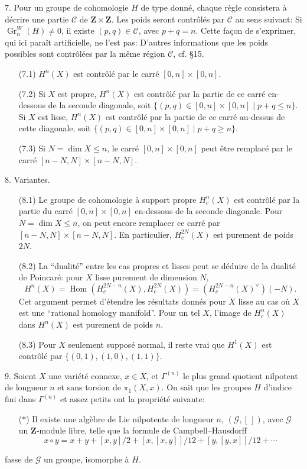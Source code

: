 \documentclass{amsart}
\theoremstyle{plain}
\theoremstyle{definition}
\theoremstyle{remark}
\DeclareMathOperator{\Gr}{Gr}
\DeclareMathOperator{\Hom}{Hom}
\begin{document}
7. Pour un groupe de cohomologie $H$ de type donn\'e, chaque r\`egle consistera \`a d\'ecrire une partie $\mathscr{C}$ de $\mathbf{Z} \times \mathbf{Z}$. Les poids seront contr\^ol\'es par $\mathscr{C}$ au sens suivant: Si $\Gr_n^W(H) \neq 0$, il existe $(p,q) \in \mathscr{C}$, avec $p + q = n$. Cette fa\c{c}on de s'exprimer, qui ici para\^it artificielle, ne l'est pas: D'autres informations que les poids possibles sont contr\^ol\'ees par la m\^eme r\'egion $\mathscr{C}$, cf. \S 15.
\begin{itemize}
\item[(7.1)] $H^n(X)$ est contr\^ol\'e par le carr\'e $[0,n] \times [0,n]$.
\item[(7.2)] Si $X$ est propre, $H^n(X)$ est contr\^ol\'e par la partie de ce carr\'e en-dessous de la seconde diagonale, soit $\{(p,q) \in [0,n] \times [0,n] \mid p + q \leq n\}$. Si $X$ est lisse, $H^n(X)$ est contr\^ol\'e par la partie de ce carr\'e au-dessus de cette diagonale, soit $\{(p,q) \in [0,n] \times [0,n] \mid p + q \geq n\}$.
\item[(7.3)] Si $N = \dim X \leq n$, le carr\'e $[0,n] \times [0,n]$ peut \^etre remplac\'e par le carr\'e $[n-N,N] \times [n-N,N]$.
\end{itemize}

8. Variantes.
\begin{itemize}
\item[(8.1)] Le groupe de cohomologie \`a support propre $H_c^n(X)$ est contr\^ol\'e par la partie du carr\'e $[0,n] \times [0,n]$ en-dessous de la seconde diagonale. Pour $N = \dim X \leq n$, on peut encore remplacer ce carr\'e par $[n-N,N] \times [n-N,N]$. En particulier, $H_c^{2N}(X)$ est purement de poids $2N$.
\item[(8.2)] La ``dualit\'e'' entre les cas propres et lisses peut se d\'eduire de la dualit\'e de Poincar\'e: pour $X$ lisse purement de dimension $N$,
\[
H^n(X) = \Hom(H_c^{2N-n}(X), H_c^{2N}(X)) = (H_c^{2N-n}(X)^{\vee})(-N).
\]
Cet argument permet d'\'etendre les r\'esultats donn\'es pour $X$ lisse au cas o\`u $X$ est une ``rational homology manifold''. Pour un tel $X$, l'image de $H_c^n(X)$ dans $H^n(X)$ est purement de poids $n$.
\item[(8.3)] Pour $X$ seulement suppos\'e normal, il reste vrai que $H^1(X)$ est contr\^ol\'e par $\{(0,1), (1,0), (1,1)\}$.
\end{itemize}

9. Soient $X$ une vari\'et\'e connexe, $x \in X$, et $\Gamma^{(n)}$ le plus grand quotient nilpotent de longueur $n$ et sans torsion de $\pi_1(X,x)$. On sait que les groupes $H$ d'indice fini dans $\Gamma^{(n)}$ et assez petits ont la propri\'et\'e suivante:
\begin{itemize}
\item[($*$)] Il existe une alg\`ebre de Lie nilpotente de longueur $n$, $(\mathscr{G}, [\,])$, avec $\mathscr{G}$ un $\mathbf{Z}$-module libre, telle que la formule de Campbell--Hausdorff
\[
x \circ y = x + y + [x,y]/2 + [x,[x,y]]/12 + [y,[y,x]]/12 + \cdots
\]
\end{itemize}
fasse de $\mathscr{G}$ un groupe, isomorphe \`a $H$.
\end{document}

